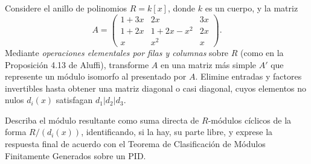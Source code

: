 \begin{ejer}
Considere el anillo de polinomios $R = k[x] $, donde $k$ es un cuerpo, y la matriz  
\[A = 
\begin{pmatrix}
1 + 3x & 2x & 3x \\
1 + 2x & 1 + 2x - x^2 & 2x \\
x & x^2 & x
\end{pmatrix}.\]  
Mediante \textit{operaciones elementales por filas y columnas} sobre $R$ (como en la Proposición 4.13 de Aluffi), transforme $A$ en una matriz más simple $A'$ que represente un módulo isomorfo al presentado por $A $. Elimine entradas y factores invertibles hasta obtener una matriz diagonal o casi diagonal, cuyos elementos no nulos $d_i(x)$ satisfagan $d_1 | d_2 | d_3 $.

Describa el módulo resultante como suma directa de $R$-módulos cíclicos de la forma $R/(d_i(x)) $, identificando, si la hay, su parte libre, y exprese la respuesta final de acuerdo con el Teorema de Clasificación de Módulos Finitamente Generados sobre un PID.
\end{ejer}
